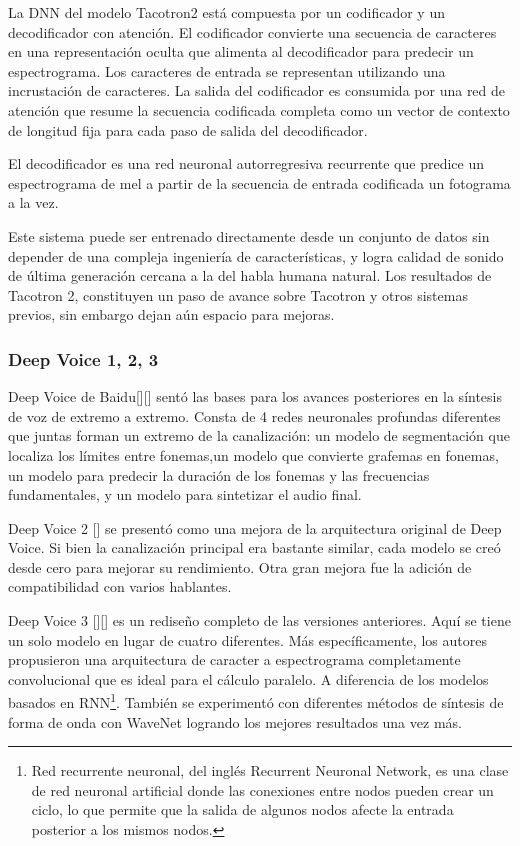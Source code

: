 La DNN del modelo Tacotron2 está compuesta por un codificador y un decodificador con atención. El codificador convierte una secuencia de caracteres en una representación oculta que alimenta al decodificador para predecir un espectrograma. Los caracteres de entrada se representan utilizando una incrustación de caracteres. La salida del codificador es consumida por una red de atención que resume la secuencia codificada completa como un vector de contexto de longitud fija para cada paso de salida del decodificador.

El decodificador es una red neuronal autorregresiva recurrente que predice un espectrograma de mel a partir de la secuencia de entrada codificada un fotograma a la vez. 

Este sistema puede ser entrenado directamente desde un conjunto de datos sin depender de una compleja ingeniería de características, y logra calidad de sonido de última generación cercana a la del habla humana natural. Los resultados de Tacotron 2, constituyen un paso de avance sobre Tacotron y otros sistemas previos, sin embargo dejan aún espacio para mejoras. 


\subsubsection{Deep Voice 1, 2, 3}
Deep Voice de Baidu[\cite{deep-voice}][\cite{arik2018neural}] sentó las bases para los avances posteriores en la síntesis de voz de extremo a extremo. Consta de 4 redes neuronales profundas diferentes que juntas forman un extremo de la canalización: un modelo de segmentación que localiza los límites entre fonemas,un modelo que convierte grafemas en fonemas, un modelo para predecir la duración de los fonemas y las frecuencias fundamentales, y un modelo para sintetizar el audio final.

Deep Voice 2 [\cite{arik2018neural}]  se presentó como una mejora de la arquitectura original de Deep Voice. Si bien la canalización principal era bastante similar, cada modelo se creó desde cero para mejorar su rendimiento. Otra gran mejora fue la adición de compatibilidad con varios hablantes.

Deep Voice 3 [\cite{arik2018neural}][\cite{deep-voice3}] es un rediseño completo de las versiones anteriores. Aquí se tiene un solo modelo en lugar de cuatro diferentes. Más específicamente, los autores propusieron una arquitectura de caracter a espectrograma completamente convolucional que es ideal para el cálculo paralelo. A diferencia de los modelos basados en RNN\footnote{Red recurrente neuronal, del inglés Recurrent Neuronal Network, es una clase de red neuronal artificial donde las conexiones entre nodos pueden crear un ciclo, lo que permite que la salida de algunos nodos afecte la entrada posterior a los mismos nodos.}. También se experimentó con diferentes métodos de síntesis de forma de onda con WaveNet logrando los mejores resultados una vez más.

